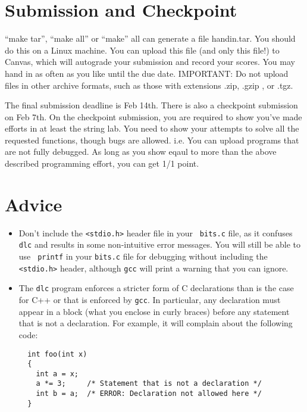 \documentclass[11pt]{article}
\begin{document}
\section{Submission and Checkpoint}

``make tar'', ``make all'' or ``make'' all can generate a file
handin.tar. You should do this on a Linux machine.  You can upload this
file (and only this file!)  to Canvas, which will autograde your
submission and record your scores. You may hand in as often as you
like until the due date. IMPORTANT:  Do  not  upload  files  in  other 
archive  formats,  such  as  those  with  extensions .zip, .gzip , or .tgz.

The final submission deadline is Feb 14th. There is also a checkpoint
submission on Feb 7th.
On the checkpoint submission, you are required to show you've made
efforts in at least the string lab. You need to show your attempts to
solve all the requested functions, though bugs are allowed.
i.e. You can upload programs that are not fully debugged.
As long as you show eqaul to more than the above described programming
effort, you can get 1/1 point.


\section{Advice}

\begin{itemize}

\item Don't include the \verb:<stdio.h>: header file in your {\tt
bits.c} file, as it confuses \texttt{dlc} and results in some
non-intuitive error messages. You will still be able to use {\tt
printf} in your {\tt bits.c} file for debugging without including the
\verb:<stdio.h>: header, although \texttt{gcc} will print a warning that
you can ignore.

\item The \texttt{dlc} program enforces a stricter form of C declarations
than is the case for C++ or that is enforced by \texttt{gcc}.  In
particular, any declaration must appear in a block (what you enclose
in curly braces) before any statement that is not a declaration.  For
example, it will complain about the following code:
\begin{verbatim}
  int foo(int x)
  {
    int a = x;
    a *= 3;     /* Statement that is not a declaration */
    int b = a;  /* ERROR: Declaration not allowed here */
  }
\end{verbatim}

\end{itemize}
\end{document}

